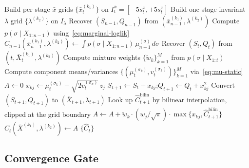 \documentclass[11pt]{article}
\begin{document}
\begin{algorithm}[H]
\caption{Numerical DP for the random-variance Bayes-optimal threshold.}
\label{alg:adp-random}
\begin{algorithmic}[1]
\State Build per-stage \(\bar x\)-grids $\{\bar x_t^{(k_1)}\}$ on $I_t^{\bar x}=[-5s_t^{\bar x},+5s_t^{\bar x}]$
\State Build one stage-invariant $\lambda$ grid $\{\lambda^{(k_2)}\}$ on $I_\lambda$
  \State Recover $(S_{n-1},Q_{n-1})$ from $(\bar x_{n-1}^{(k_1)},\lambda^{(k_2)})$
  \State Compute \(p(\sigma\mid X_{1:n-1})\) using~\eqref{eq:marginal-loglik}
  \State $\widehat C_{n-1}(\bar x_{n-1}^{(k_1)},\lambda^{(k_2)}) \gets \int p(\sigma\mid X_{1:n-1})\,\mu_{n-1}^{(\sigma)}\,d\sigma$
\EndFor
{}
    \State Recover $(S_t, Q_t)$ from $(t, \bar X_t^{(k_1)}, \lambda^{(k_2)})$
    \State Compute mixture weights $\{\tilde w_k\}_{k=1}^M$ from $p(\sigma \mid X_{1:t})$
    \State Compute component means/variances $\{(\mu_t^{(\sigma_k)}, v_t^{(\sigma_k)})\}_{k=1}^M$ via~\eqref{eq:mu-static}
    \State $A \gets 0$
      \State $x_{kj} \gets \mu_t^{(\sigma_k)} + \sqrt{2 v_t^{(\sigma_k)}}\, z_j$
      \State $S_{t+1} \gets S_t + x_{kj}$;\quad $Q_{t+1} \gets Q_t + x_{kj}^2$
      \State Convert $(S_{t+1},Q_{t+1})$ to $(\bar X_{t+1},\lambda_{t+1})$
      \State Look up $\widehat C_{t+1}^{\mathrm{bilin}}$ by bilinear interpolation, clipped at the grid boundary
      \State $A \gets A + \tilde w_k \cdot (w_j/\sqrt\pi) \cdot \max\!\big\{x_{kj}, \widehat C_{t+1}^{\mathrm{bilin}}\big\}$
    \EndFor
    \State $\widehat C_t(\bar X^{(k_1)}, \lambda^{(k_2)}) \gets A$
  \EndFor
\EndFor
\State \Return $\{\widehat C_t\}$
\end{algorithmic}
\end{algorithm}

\subsection{Convergence Gate}
\label{app:adp-convergence}
\end{document}
